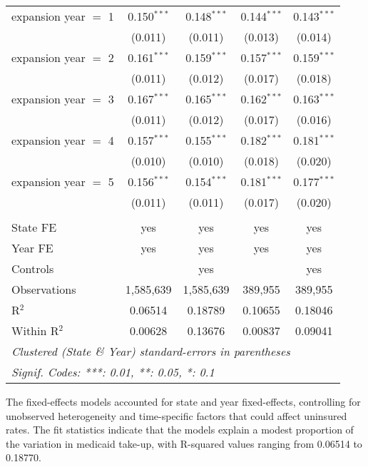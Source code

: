 \documentclass[
]{article}
\begin{document}
\begin{table}[htbp]
\begin{tabular}{lcccc}
      expansion year $=$ 1  & 0.150$^{***}$ & 0.148$^{***}$ & 0.144$^{***}$  & 0.143$^{***}$\\   
                            & (0.011)       & (0.011)       & (0.013)        & (0.014)\\   
      expansion year $=$ 2  & 0.161$^{***}$ & 0.159$^{***}$ & 0.157$^{***}$  & 0.159$^{***}$\\   
                            & (0.011)       & (0.012)       & (0.017)        & (0.018)\\   
      expansion year $=$ 3  & 0.167$^{***}$ & 0.165$^{***}$ & 0.162$^{***}$  & 0.163$^{***}$\\   
                            & (0.011)       & (0.012)       & (0.017)        & (0.016)\\   
      expansion year $=$ 4  & 0.157$^{***}$ & 0.155$^{***}$ & 0.182$^{***}$  & 0.181$^{***}$\\   
                            & (0.010)       & (0.010)       & (0.018)        & (0.020)\\   
      expansion year $=$ 5  & 0.156$^{***}$ & 0.154$^{***}$ & 0.181$^{***}$  & 0.177$^{***}$\\   
                            & (0.011)       & (0.011)       & (0.017)        & (0.020)\\   
       \\
      State FE              & yes           & yes           & yes            & yes\\  
      Year FE               & yes           & yes           & yes            & yes\\  
      Controls              &               & yes           &                & yes\\  
      Observations          & 1,585,639     & 1,585,639     & 389,955        & 389,955\\  
      R$^2$                 & 0.06514       & 0.18789       & 0.10655        & 0.18046\\  
      Within R$^2$          & 0.00628       & 0.13676       & 0.00837        & 0.09041\\  
      \midrule \midrule
      \multicolumn{5}{l}{\emph{Clustered (State \& Year) standard-errors in parentheses}}\\
      \multicolumn{5}{l}{\emph{Signif. Codes: ***: 0.01, **: 0.05, *: 0.1}}\\
   \end{tabular}
\end{table}

The fixed-effects models accounted for state and year fixed-effects,
controlling for unobserved heterogeneity and time-specific factors that
could affect uninsured rates. The fit statistics indicate that the
models explain a modest proportion of the variation in medicaid take-up,
with R-squared values ranging from 0.06514 to 0.18770.
\end{document}
